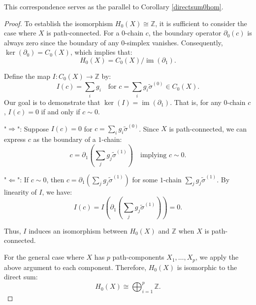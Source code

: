 This correspondence serves as the parallel to Corollary \ref{directsum0hom}.

\begin{proof}
	To establish the isomorphism $H_{0}(X) \cong \mathbb{Z}$, it is sufficient to
	consider the case where $X$ is path-connected. For a $0$-chain $c$, the
	boundary operator $\partial_{0}(c)$ is always zero since the boundary of any
	$0$-simplex vanishes. Consequently, $\ker(\partial_{0}) = C_{0}(X)$, which implies
	that:
	\[
		H_{0}(X) = C_{0}(X) / \operatorname{im}(\partial_{1}).
	\]

	Define the map $I: C_{0}(X) \to \mathbb{Z}$ by:
	\[
		I(c) = \sum_{i} g_{i} \quad \text{for }c = \sum_{i} g_{i} \tilde{\sigma}^{(0)}
		\in C_{0}(X).
	\]
	Our goal is to demonstrate that $\ker(I) = \operatorname{im}(\partial_{1})$. That
	is, for any $0$-chain $c$, $I(c) = 0$ if and only if $c \sim 0$.

	"$\Rightarrow$": Suppose $I(c) = 0$ for
	$c = \sum_{i} g_{i} \tilde{\sigma}^{(0)}$. Since $X$ is path-connected, we can
	express $c$ as the boundary of a $1$-chain:
	\[
		c = \partial_{1} \left( \sum_{j} g_{j} \tilde{\sigma}^{(1)}\right) \quad \text{implying
		}c \sim 0.
	\]

	"$\Leftarrow$": If $c \sim 0$, then
	$c = \partial_{1} \left( \sum_{j} g_{j} \tilde{\sigma}^{(1)}\right)$ for some
	$1$-chain $\sum_{j} g_{j} \tilde{\sigma}^{(1)}$. By linearity of $I$, we have:
	\[
		I(c) = I \left( \partial_{1} \left( \sum_{j} g_{j} \tilde{\sigma}^{(1)}\right
		) \right) = 0.
	\]

	Thus, $I$ induces an isomorphism between $H_{0}(X)$ and $\mathbb{Z}$ when $X$ is
	path-connected.

	For the general case where $X$ has $p$ path-components $X_{1}, \ldots, X_{p}$,
	we apply the above argument to each component. Therefore, $H_{0}(X)$ is
	isomorphic to the direct sum:
	\[
		H_{0}(X) \cong \bigoplus_{i=1}^{p}\mathbb{Z}.
	\]
\end{proof}

